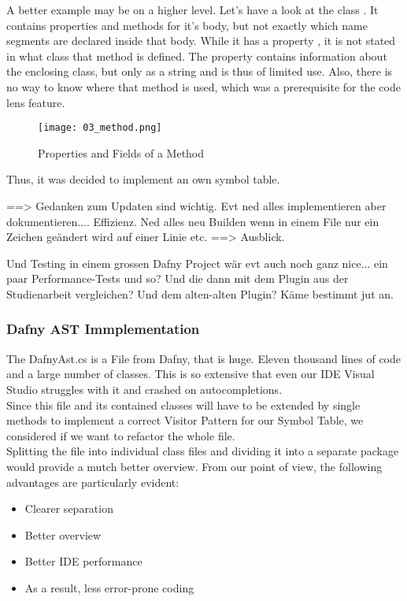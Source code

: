 A better example may be on a higher level. Let's have a look at the class . It contains properties and methods for it's body, but not exactly which name segments are declared inside that body. While it has a property , it is not stated in what class that method is defined. The property  contains information about the enclosing class, but only as a string and is thus of limited use. Also, there is no way to know where that method is used, which was a prerequisite for the code lens feature.

\begin{figure}[h]
    \centering
    \texttt{[image: 03\_method.png]}
    \caption{Properties and Fields of a Method}
    \label{fig:method}
\end{figure}

Thus, it was decided to implement an own symbol table.






==> Gedanken zum Updaten sind wichtig. Evt ned alles implementieren aber dokumentieren.... Effizienz. Ned alles neu Builden
wenn in einem File nur ein Zeichen geändert wird auf einer Linie etc. ==> Ausblick.

Und Testing in einem grossen Dafny Project wär evt auch noch ganz nice... ein paar Performance-Tests und so?
Und die dann mit dem Plugin aus der Studienarbeit vergleichen? Und dem alten-alten Plugin? Käme bestimmt jut an.


\subsubsection{Dafny AST Immplementation}
The DafnyAst.cs is a File from Dafny, that is huge.
Eleven thousand lines of code and a large number of classes.
This is so extensive that even our IDE Visual Studio struggles with it and crashed on autocompletions. \\

Since this file and its contained classes will have to be extended by single methods
to implement a correct Visitor Pattern for our Symbol Table, we considered if we want to refactor the whole file.  \\

Splitting the file into individual class files and dividing it into a separate package would provide a mutch better overview.
From our point of view, the following advantages are particularly evident:
\begin{itemize}
    \item Clearer separation
    \item Better overview
    \item Better IDE performance
    \item As a result, less error-prone coding
\end{itemize}

